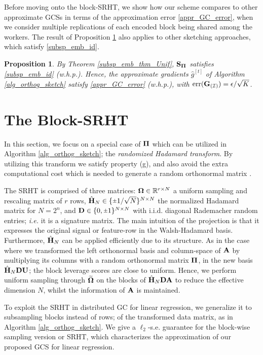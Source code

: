 \documentclass[journal,letterpaper,onecolumn,twoside,nofonttune]{IEEEtran}
\newcommand{\I}{\mathcal{I}}
\newcommand{\Ub}{\bold{U}}
\newcommand{\Gb}{\bold{G}}
\newcommand{\Pibold}{\bold{\Pi}}
\newcommand{\Omb}{\bold{\Omega}}
\newcommand{\Ombwt}{\widetilde{\Omb}}
\newcommand{\R}{\mathbb{R}}
\newcommand{\gh}{\hat{g}}
\newcommand{\Sb}{\bold{S}}
\newcommand{\SbPi}{\Sb_{\Pibold}}
\newcommand{\Ab}{\bold{A}}
\newcommand{\Db}{\bold{D}}
\newcommand{\Hbh}{\hat{\bold{H}}}
\newcommand{\err}{\mathrm{err}}
\newcommand{\rpm}{\raisebox{.2ex}{$\scriptstyle\pm$}}
\newtheorem{Prop}{Proposition}
\begin{document}
Before moving onto the block-SRHT, we show how our scheme compares to other approximate GCSs in terms of the approximation error \eqref{appr_GC_error}, when we consider multiple replications of each encoded block being shared among the workers. The result of Proposition \ref{appr_GC_prop} also applies to other sketching approaches, which satisfy \eqref{subsp_emb_id}.

\begin{Prop}
\label{appr_GC_prop}
By Theorem \ref{subsp_emb_thm_Unif}, $\SbPi$ satisfies \eqref{subsp_emb_id} (w.h.p.). Hence, the approximate gradients $\gh^{[t]}$ of Algorithm \ref{alg_orthog_sketch} satisfy \eqref{appr_GC_error} (w.h.p.), with $\err(\Gb_{(\I)})=\epsilon/\sqrt{K}$.
\end{Prop}

\section{The Block-SRHT}
\label{block_SRHT_sec}

In this section, we focus on a special case of $\Pibold$ which can be utilized in Algorithm \ref{alg_orthog_sketch}; the \textit{randomized Hadamard transform}. By utilizing this transform we satisfy property (g), and also avoid the extra computational cost which is needed to generate a random orthonormal matrix \cite{JHD21}.

The SRHT is comprised of three matrices: $\Omb\in\R^{r\times N}$ a uniform sampling and rescaling matrix of $r$ rows, $\Hbh_N\in\{\rpm1/\sqrt{N}\}^{N\times N}$ the normalized Hadamard matrix for $N=2^n$, and $\Db\in\{0,\rpm1\}^{N\times N}$ with i.i.d. diagonal Rademacher random entries; \textit{i.e.} it is a signature matrix. The main intuition of the projection is that it expresses the original signal or feature-row in the Walsh-Hadamard basis. Furthermore, $\Hbh_N$ can be applied efficiently due to its structure. As in the case where we transformed the left orthonormal basis and column-space of $\Ab$ by multiplying its columns with a random orthonormal matrix $\Pibold$, in the new basis $\Hbh_N\Db\Ub$; the block leverage scores are close to uniform. Hence, we perform uniform sampling through $\Ombwt$ on the blocks of $\Hbh_N\Db\Ab$ to reduce the effective dimension $N$, whilst the information of $\Ab$ is maintained.

To exploit the SRHT in distributed GC for linear regression, we generalize it to subsampling blocks instead of rows; of the transformed data matrix, as in Algorithm \ref{alg_orthog_sketch}. We give a $\ell_2$-s.e. guarantee for the block-wise sampling version or SRHT, which characterizes the approximation of our proposed GCS for linear regression.
\end{document}
